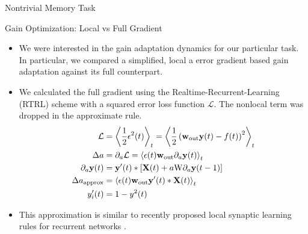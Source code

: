 \documentclass{beamer}
\begin{document}
\begin{frame}[t]
\begin{columns}[t]
\begin{column}{.55\textwidth}
\begin{myblock}{Nontrivial Memory Task}
\end{myblock}

\begin{myblock}{Gain Optimization: Local vs Full Gradient}
	
	\begin{itemize}
		\item We were interested in the gain adaptation dynamics for our particular task. In particular, we compared a simplified, local a error gradient based gain adaptation against its full counterpart.
		\item We calculated the full gradient using the Realtime-Recurrent-Learning (RTRL) scheme with a squared error loss function $\mathcal{L}$. The nonlocal term was dropped in the approximate rule.
		\vspace{5pt}
		\begin{align*}
		\mathcal{L} &= \left\langle \frac{1}{2} \epsilon^2(t)\right\rangle_t = \left\langle \frac{1}{2} \left( \mathbf{w}_{\rm out} \mathbf{y}(t) - f(t)\right)^2\right\rangle_t \\
		\Delta a &= \partial_a \mathcal{L} = \left\langle \epsilon(t) \mathbf{w}_{\rm out} \partial_a \mathbf{y}(t) \right\rangle_t \\
		\partial_a \mathbf{y}(t) &= \mathbf{y}'(t) \ast \left[ \mathbf{X}(t) + a \mathrm{W} \partial_a \mathbf{y}(t-1)\right] \\
		\Delta a_{\rm approx} &= \left\langle \epsilon(t) \mathbf{w}_{\rm out} \mathbf{y}'(t) \ast \mathbf{X}(t) \right\rangle_t \\
		y'_i(t) &= 1-y^2(t)
		\end{align*}
		\item This approximation is similar to recently proposed local synaptic learning rules for recurrent networks \cite{Murray_2019}.
	\end{itemize}
	

\end{myblock}
\end{column}
\end{columns}
\end{frame}
\end{document}
